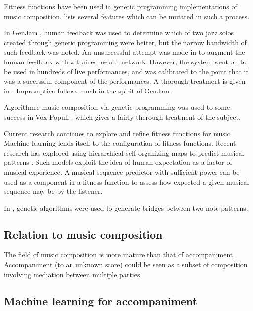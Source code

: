 \documentclass[11pt,conference,letterpaper]{IEEEtran}
\begin{document}
Fitness functions have been used in genetic programming implementations of music composition. \cite{towsey2001towards} lists several features which can be mutated in such a process.

In GenJam \cite{biles1994genjam}, human feedback was used to determine which of two jazz solos created through genetic programming were better, but the narrow bandwidth of such feedback was noted. An unsuccessful attempt was made in  \cite{biles1996neural} to augment the human feedback with a trained neural network. However, the system went on to be used in hundreds of live performances, and was calibrated to the point that it was a successful component of the performances. A thorough treatment is given in \cite{biles2007improvizing}. Impromptica follows much in the spirit of GenJam.

Algorithmic music composition via genetic programming was used to some success in Vox Populi \cite{moroni2000vox}, which gives a fairly thorough treatment of the subject.

Current research continues to explore and refine fitness functions for music. Machine learning lends itself to the configuration of fitness functions. Recent research has explored using hierarchical self-organizing maps to predict musical patterns \cite{law2008towards}. Such models exploit the idea of human expectation as a factor of musical experience. A musical sequence predictor with sufficient power can be used as a component in a fitness function to assess how expected a given musical sequence may be by the listener.


In \cite{horner1991genetic}, genetic algorithms were used to generate bridges between two note patterns.

\subsection{Relation to music composition}

The field of music composition is more mature than that of accompaniment. Accompaniment (to an unknown score) could be seen as a subset of composition involving mediation between multiple parties.

\subsection{Machine learning for accompaniment}
\end{document}
